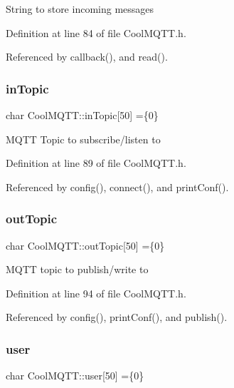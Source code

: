 String to store incoming messages 

Definition at line 84 of file Cool\+M\+Q\+T\+T.\+h.



Referenced by callback(), and read().

\mbox{\label{class_cool_m_q_t_t_a4492f52a441e83cc5151010317fdb52d}} 
\subsubsection{\texorpdfstring{in\+Topic}{inTopic}}
{\footnotesize\ttfamily char Cool\+M\+Q\+T\+T\+::in\+Topic\mbox{[}50\mbox{]} =\{\textquotesingle{}0\textquotesingle{}\}\hspace{0.3cm}{\ttfamily [private]}}

M\+Q\+TT Topic to subscribe/listen to 

Definition at line 89 of file Cool\+M\+Q\+T\+T.\+h.



Referenced by config(), connect(), and print\+Conf().

\mbox{\label{class_cool_m_q_t_t_a109c786a17b463f9eeba046194279522}} 
\subsubsection{\texorpdfstring{out\+Topic}{outTopic}}
{\footnotesize\ttfamily char Cool\+M\+Q\+T\+T\+::out\+Topic\mbox{[}50\mbox{]} =\{\textquotesingle{}0\textquotesingle{}\}\hspace{0.3cm}{\ttfamily [private]}}

M\+Q\+TT topic to publish/write to 

Definition at line 94 of file Cool\+M\+Q\+T\+T.\+h.



Referenced by config(), print\+Conf(), and publish().

\mbox{\label{class_cool_m_q_t_t_a8cd47e45d457f908d4b4390b35aaee83}} 
\subsubsection{\texorpdfstring{user}{user}}
{\footnotesize\ttfamily char Cool\+M\+Q\+T\+T\+::user\mbox{[}50\mbox{]} =\{\textquotesingle{}0\textquotesingle{}\}\hspace{0.3cm}{\ttfamily [private]}}


